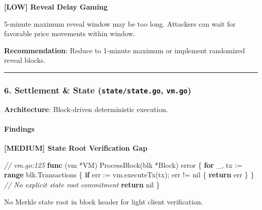\documentclass[
]{article}
\newenvironment{Shaded}{}{}
\newcommand{\CommentTok}[1]{\textcolor[rgb]{0.38,0.63,0.69}{\textit{#1}}}
\newcommand{\ControlFlowTok}[1]{\textcolor[rgb]{0.00,0.44,0.13}{\textbf{#1}}}
\newcommand{\DataTypeTok}[1]{\textcolor[rgb]{0.56,0.13,0.00}{#1}}
\newcommand{\KeywordTok}[1]{\textcolor[rgb]{0.00,0.44,0.13}{\textbf{#1}}}
\newcommand{\NormalTok}[1]{#1}
\newcommand{\OperatorTok}[1]{\textcolor[rgb]{0.40,0.40,0.40}{#1}}
\newcommand{\OtherTok}[1]{\textcolor[rgb]{0.00,0.44,0.13}{#1}}
\begin{document}
\textbf{{[}LOW{]} Reveal Delay Gaming}

5-minute maximum reveal window may be too long. Attackers can wait for
favorable price movements within window.

\textbf{Recommendation}: Reduce to 1-minute maximum or implement
randomized reveal blocks.

\begin{center}\rule{0.5\linewidth}{0.5pt}\end{center}

\subsubsection{\texorpdfstring{6. Settlement \& State
(\texttt{state/state.go},
\texttt{vm.go})}{6. Settlement \& State (state/state.go, vm.go)}}\label{6-settlement--state-statestatego-vmgo}

\textbf{Architecture}: Block-driven deterministic execution.

\paragraph{Findings}\label{findings-5}

\textbf{{[}MEDIUM{]} State Root Verification Gap}

\begin{Shaded}
\begin{Highlighting}[]
\CommentTok{// vm.go:125}
\KeywordTok{func} \OperatorTok{(}\NormalTok{vm }\OperatorTok{*}\NormalTok{VM}\OperatorTok{)}\NormalTok{ ProcessBlock}\OperatorTok{(}\NormalTok{blk }\OperatorTok{*}\NormalTok{Block}\OperatorTok{)} \DataTypeTok{error} \OperatorTok{\{}
    \ControlFlowTok{for}\NormalTok{ \_}\OperatorTok{,}\NormalTok{ tx }\OperatorTok{:=} \KeywordTok{range}\NormalTok{ blk}\OperatorTok{.}\NormalTok{Transactions }\OperatorTok{\{}
        \ControlFlowTok{if}\NormalTok{ err }\OperatorTok{:=}\NormalTok{ vm}\OperatorTok{.}\NormalTok{executeTx}\OperatorTok{(}\NormalTok{tx}\OperatorTok{);}\NormalTok{ err }\OperatorTok{!=} \OtherTok{nil} \OperatorTok{\{}
            \ControlFlowTok{return}\NormalTok{ err}
        \OperatorTok{\}}
    \OperatorTok{\}}
    \CommentTok{// No explicit state root commitment}
    \ControlFlowTok{return} \OtherTok{nil}
\OperatorTok{\}}
\end{Highlighting}
\end{Shaded}

No Merkle state root in block header for light client verification.
\end{document}
